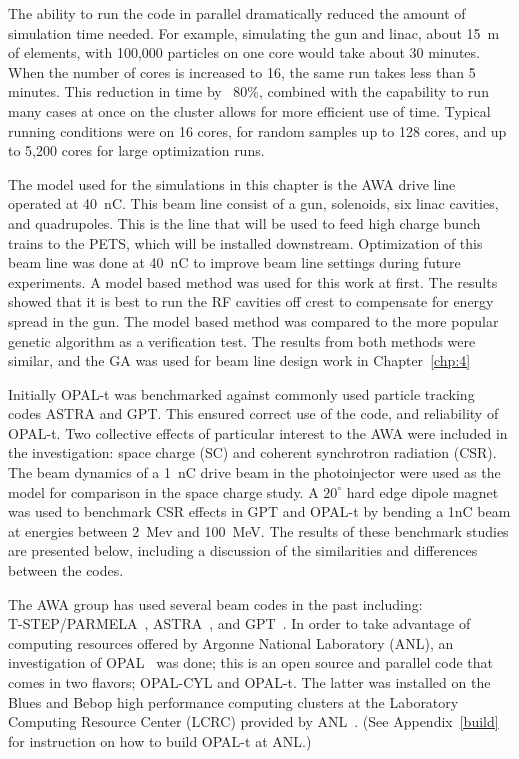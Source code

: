 The ability to run the code in parallel dramatically reduced the amount of simulation time needed. 
For example, simulating the gun and linac, about \SI{15}{m} of elements,
with 100,000 particles on one core would take about 30 minutes. 
When the number of cores is increased to 16, the same run takes less than 
5 minutes. This reduction in time by ~80\%, combined with the capability to run 
many cases at once on the cluster allows for more efficient use of time.
Typical running conditions were on 16 cores, for random samples up to 128 cores, 
and up to 5,200 cores for large optimization runs.

The model used for the simulations in this chapter is the AWA drive line operated at \SI{40}{nC}. 
This beam line consist of a gun, solenoids, six linac cavities, and quadrupoles.
This is the line that will be used to feed high charge bunch trains to the PETS, 
which will be installed downstream. Optimization of this beam line was done at \SI{40}{nC}
to improve beam line settings during future experiments.
A model based method was used for this work at first. The results showed that 
it is best to run the RF cavities off crest to compensate for energy spread in the gun. 
The model based method was compared to the more popular genetic algorithm as a verification test.
The results from both methods were similar, and the GA was used for beam line design work in Chapter~\ref{chp:4}

\label{sec:bench}

Initially OPAL-t was benchmarked against commonly used particle tracking codes ASTRA and GPT.  
This ensured correct use of the code, and reliability of \mbox{OPAL-t}.  
Two collective effects of particular interest to the AWA were included in the investigation: 
space charge (SC) and coherent synchrotron radiation (CSR).
The beam dynamics of a \SI{1}{nC} drive beam in the photoinjector were used as 
the model for comparison in the space charge study. 
A $20^{\circ}$ hard edge dipole magnet was used to benchmark CSR effects in GPT and OPAL-t by bending a 1nC beam 
at energies between \SI{2}{Mev} and \SI{100}{MeV}.  
The results of these benchmark studies are presented below, 
including a discussion of the similarities and differences between the codes.
 
The AWA group has used several beam codes in the past including:\\
\mbox{T-STEP/PARMELA}~\cite{parmela}, ASTRA~\cite{astra}, and GPT~\cite{gpt}.  
In order to take advantage of computing resources offered by 
Argonne National Laboratory (ANL), an investigation of 
OPAL~\cite{opal} was done; this is an open source and parallel code that comes in two flavors;  
OPAL-CYL and OPAL-t. The latter was installed on the Blues and Bebop high performance computing clusters
at the Laboratory Computing Resource Center (LCRC) provided by ANL~\cite{lcrc}.
(See Appendix~\ref{build} for instruction on how to build OPAL-t at ANL.)

